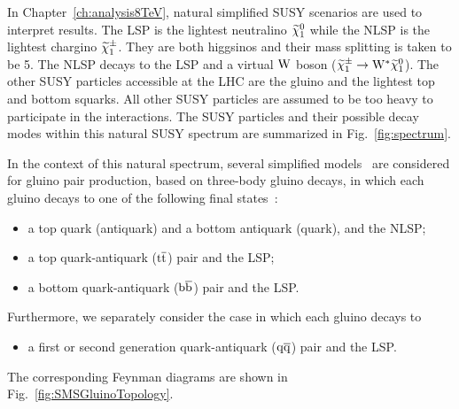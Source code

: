 In Chapter~\ref{ch:analysis8TeV}, natural simplified SUSY scenarios are used to interpret
results. The LSP is the lightest neutralino $\widetilde{\chi}^{0}_1$ while the NLSP
is the lightest chargino $\widetilde{\chi}^{\pm}_1$.  They are both higgsinos and
their mass splitting is taken to be 5\GeV. The NLSP decays to the LSP
and a virtual $\mathrm{W}$ boson ($\widetilde{\chi}^{\pm}_1 \to \mathrm{W}^{\ast} \widetilde{\chi}^{0}_1$). The
other SUSY particles accessible at the LHC are the gluino and the
lightest top and bottom squarks. All other SUSY particles are
assumed to be too heavy to participate in the interactions. The SUSY
particles and their possible decay modes within this natural SUSY
spectrum are summarized in Fig.~\ref{fig:spectrum}.

In the context of this natural spectrum, several simplified
models~\cite{ArkaniHamed:2007fw,Alwall:2008ag,Alwall:2008va,Alves:2011sq,Alves:2011wf,Graesser:2012qy}
are considered for gluino pair production, based on three-body gluino
decays, in which each gluino decays to one of the following final states~\cite{SUS-11-016}:
\begin{itemize}
\item a top quark (antiquark) and a bottom antiquark (quark),
  and the NLSP; 
\item a top quark-antiquark ($\mathrm{t}\overline{\mathrm{t}}$) pair and the LSP;
\item a bottom quark-antiquark ($\mathrm{b}\overline{\mathrm{b}}$) pair and the LSP.
\end{itemize}
Furthermore, we separately consider the case in which each gluino
decays to
\begin{itemize}
\item a first or second generation quark-antiquark ($\mathrm{q}\overline{\mathrm{q}}$) pair and the LSP.
\end{itemize}
The corresponding Feynman diagrams are shown in
Fig.~\ref{fig:SMSGluinoTopology}.

